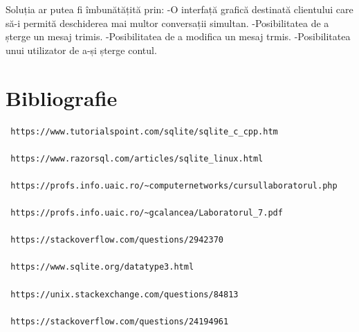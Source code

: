 \documentclass[a4paper,12pt]{article}
\begin{document}
Soluția ar putea fi îmbunătățită prin:\newline
-O interfață grafică destinată clientului care să-i permită deschiderea mai multor conversații simultan.\newline
-Posibilitatea de a șterge un mesaj trimis.\newline
-Posibilitatea de a modifica un mesaj trmis.\newline
-Posibilitatea unui utilizator de a-și șterge contul.\newline

\section {Bibliografie}

\begin{verbatim}
 https://www.tutorialspoint.com/sqlite/sqlite_c_cpp.htm
 
 https://www.razorsql.com/articles/sqlite_linux.html
 
 https://profs.info.uaic.ro/~computernetworks/cursullaboratorul.php
 
 https://profs.info.uaic.ro/~gcalancea/Laboratorul_7.pdf
 
 https://stackoverflow.com/questions/2942370
 
 https://www.sqlite.org/datatype3.html

 https://unix.stackexchange.com/questions/84813

 https://stackoverflow.com/questions/24194961
 
\end{verbatim}
\end{document}
